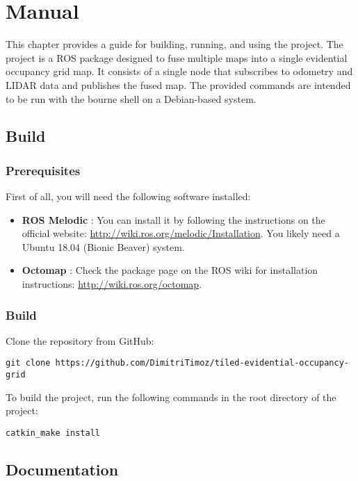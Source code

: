 
\chapter{Manual}

This chapter provides a guide for building, running, and using the project.
The project is a ROS package designed to fuse multiple maps into a single evidential occupancy grid map.
It consists of a single node that subscribes to odometry and LIDAR data and publishes the fused map.
The provided commands are intended to be run with the bourne shell on a Debian-based system.

\section{Build}

\subsection{Prerequisites}

First of all, you will need the following software installed:
\begin{itemize}
    \item \textbf{ROS Melodic} : You can install it by following the instructions on the official website: \url{http://wiki.ros.org/melodic/Installation}. You likely need a Ubuntu 18.04 (Bionic Beaver) system.
    \item \textbf{Octomap} : Check the package page on the ROS wiki for installation instructions: \url{http://wiki.ros.org/octomap}.
\end{itemize}

\subsection{Build}

Clone the repository from GitHub:
\begin{verbatim}
git clone https://github.com/DimitriTimoz/tiled-evidential-occupancy-grid
\end{verbatim}

To build the project, run the following commands in the root directory of the project:
\begin{verbatim}
catkin_make install
\end{verbatim}

\section{Documentation}

